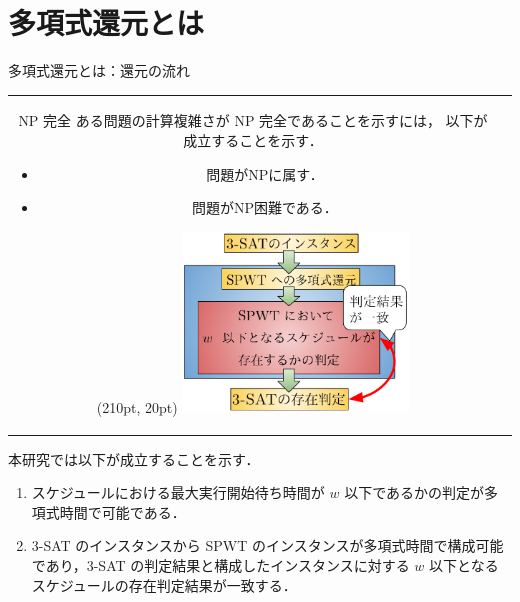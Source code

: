 \documentclass[dvipdfmx]{beamer}
\begin{document}
\section{多項式還元とは}
\begin{frame}{多項式還元とは：還元の流れ}
  \begin{tabular}{cc}
    \begin{minipage}[c]{0.5\hsize}
      \begin{block}{NP 完全}
        ある問題の計算複雑さが NP 完全であることを示すには，
        以下が成立することを示す．
        \begin{itemize}
          \item 問題がNPに属す．
          \item 問題がNP困難である．
        \end{itemize}
      \end{block}
    \end{minipage}
    \begin{minipage}[c]{0.5\hsize}
      \begin{textblock*}{0.4\linewidth}(210pt, 20pt)
        \centering
        \includegraphics[width=6cm,bb=0 0 350 260]{figure/reduction.pdf}
      \end{textblock*}
    \end{minipage}
  \end{tabular}
  \begin{block}{}
    本研究では以下が成立することを示す．
    \begin{enumerate}
      \item スケジュールにおける最大実行開始待ち時間が $w$ 以下であるかの判定が\alert{多項式時間}で可能である．
      \item \textsc{3-SAT} のインスタンスから SPWT のインスタンスが\alert{多項式時間}で構成可能であり，\textsc{3-SAT} の判定結果と構成したインスタンスに対する $w$ 以下となるスケジュールの存在判定結果が\alert{一致}する．
    \end{enumerate}
  \end{block}
\end{frame}
\end{document}

